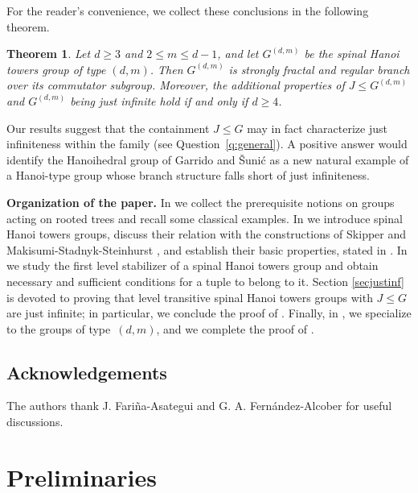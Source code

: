 \documentclass[11pt,leqno]{amsart}
\theoremstyle{plain}
\newtheorem{thmx}{Theorem}
\numberwithin{equation}{section}
\begin{document}
For the reader's convenience, we collect these conclusions in the
following theorem.
\begin{thmx}\label{thmC}
Let $d\geq 3$ and $2\leq m\leq d-1$, and let $G^{(d,m)}$ be the spinal Hanoi towers group of type $(d,m)$. Then $G^{(d,m)}$ is strongly fractal and regular branch over its commutator subgroup.
Moreover, the additional properties of $J\leq G^{(d,m)}$  and $G^{(d,m)}$ being just infinite hold if and only if $d\geq 4$.

\end{thmx}
Our results suggest that the containment $J\leq G$ may in fact characterize just infiniteness within the family (see Question~\ref{q:general}). A positive answer would identify the Hanoihedral group of Garrido and \v{S}uni\'c \cite{GarridoSunic2025} as a new natural example of a Hanoi-type group whose branch structure falls short of just infiniteness.

\medskip




\medskip


\noindent\textbf{Organization of the paper.}
In  we collect the prerequisite notions on groups
acting on rooted trees and recall some classical examples. In
 we introduce spinal Hanoi towers groups, discuss their
relation with the constructions of Skipper \cite{Rachel} and
Makisumi-Stadnyk-Steinhurst \cite{modified}, and establish their basic
properties, stated in . In
 we study the first level stabilizer of a spinal Hanoi towers
group and obtain necessary and sufficient conditions for a tuple to belong to it. Section \ref{secjustinf} is devoted to proving that level transitive spinal Hanoi towers groups with $J\le G$ are just infinite; in particular, we conclude the proof of . Finally, in , we specialize to the groups of type~$(d,m)$, and we complete the proof of .

\medskip 

\subsection*{Acknowledgements} The authors thank J. Fari\~{n}a-Asategui and G. A. Fernández-Alcober for useful discussions.

\section{Preliminaries}\label{sec:preliminaries}
\end{document}
